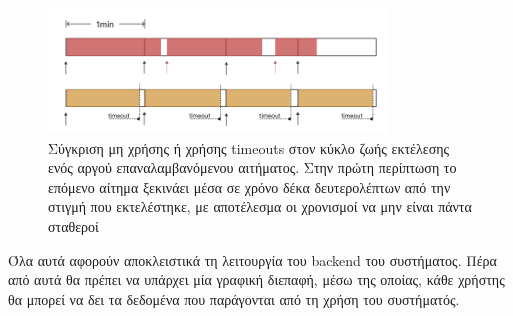 \begin{figure}[!ht]
	\centering
	\includegraphics[width=0.8\textwidth]{./images/chapter4/timeout_request_cycle.png}
	\caption[Σύγκριση μη χρήσης και χρήσης timeouts στον κύκλο ζωής εκτέλεσης ενός αργού επαναλαμβανόμενου αιτήματος]{Σύγκριση μη χρήσης ή χρήσης timeouts στον κύκλο ζωής εκτέλεσης ενός αργού επαναλαμβανόμενου αιτήματος. Στην πρώτη περίπτωση το επόμενο αίτημα ξεκινάει μέσα σε χρόνο δέκα δευτερολέπτων από την στιγμή που εκτελέστηκε, με αποτέλεσμα οι χρονισμοί να μην είναι πάντα σταθεροί}
	\label{fig:timeouts_request_cycle}
\end{figure}







Όλα αυτά αφορούν αποκλειστικά τη λειτουργία του backend του συστήματος. Πέρα από αυτά
θα πρέπει να υπάρχει μία γραφική διεπαφή, μέσω της οποίας, κάθε χρήστης θα μπορεί να δει τα δεδομένα που παράγονται
από τη χρήση του συστήματός.

